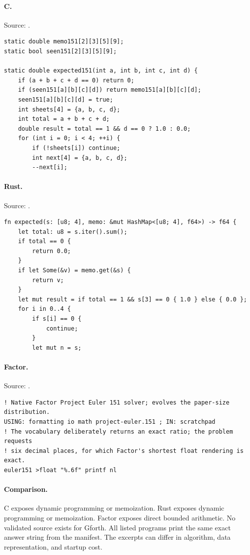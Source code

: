 \paragraph{C.} Source: .
\begin{lstlisting}
static double memo151[2][3][5][9];
static bool seen151[2][3][5][9];

static double expected151(int a, int b, int c, int d) {
    if (a + b + c + d == 0) return 0;
    if (seen151[a][b][c][d]) return memo151[a][b][c][d];
    seen151[a][b][c][d] = true;
    int sheets[4] = {a, b, c, d};
    int total = a + b + c + d;
    double result = total == 1 && d == 0 ? 1.0 : 0.0;
    for (int i = 0; i < 4; ++i) {
        if (!sheets[i]) continue;
        int next[4] = {a, b, c, d};
        --next[i];
\end{lstlisting}

\paragraph{Rust.} Source: .
\begin{lstlisting}
fn expected(s: [u8; 4], memo: &mut HashMap<[u8; 4], f64>) -> f64 {
    let total: u8 = s.iter().sum();
    if total == 0 {
        return 0.0;
    }
    if let Some(&v) = memo.get(&s) {
        return v;
    }
    let mut result = if total == 1 && s[3] == 0 { 1.0 } else { 0.0 };
    for i in 0..4 {
        if s[i] == 0 {
            continue;
        }
        let mut n = s;
\end{lstlisting}

\paragraph{Factor.} Source: .
\begin{lstlisting}
! Native Factor Project Euler 151 solver; evolves the paper-size distribution.
USING: formatting io math project-euler.151 ; IN: scratchpad
! The vocabulary deliberately returns an exact ratio; the problem requests
! six decimal places, for which Factor's shortest float rendering is exact.
euler151 >float "%.6f" printf nl
\end{lstlisting}

\paragraph{Comparison.}
C exposes dynamic programming or memoization. Rust exposes dynamic programming or memoization. Factor exposes direct bounded arithmetic.
No validated source exists for Gforth.
All listed programs print the same exact answer string from the manifest. The excerpts can differ in algorithm, data representation, and startup cost.

